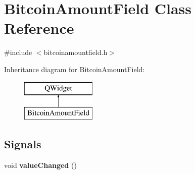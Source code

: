 \hypertarget{class_bitcoin_amount_field}{}\section{Bitcoin\+Amount\+Field Class Reference}
\label{class_bitcoin_amount_field}


{\ttfamily \#include $<$bitcoinamountfield.\+h$>$}

Inheritance diagram for Bitcoin\+Amount\+Field\+:\begin{figure}[H]
\begin{center}
\leavevmode
\includegraphics[height=2.000000cm]{class_bitcoin_amount_field}
\end{center}
\end{figure}
\subsection*{Signals}
\begin{DoxyCompactItemize}
\item 
\mbox{\label{class_bitcoin_amount_field_a633110e7cd2ed74091932459236a7949}} 
void {\bfseries value\+Changed} ()
\end{DoxyCompactItemize}
